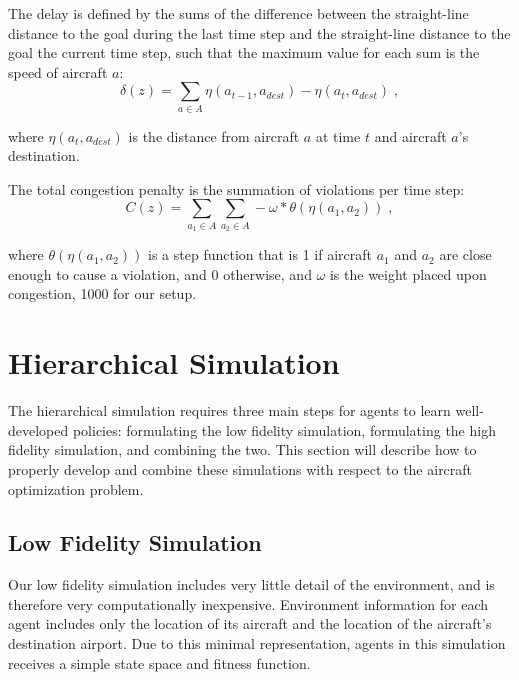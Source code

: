 \documentclass{sig-alternate}
\begin{document}
The delay is defined by the sums of the difference between the straight-line distance to the goal during the last time step and the straight-line distance to the goal the current time step, such that the maximum value for each sum is the speed of aircraft $a$:
%
\begin{equation} \label{eq:DistanceReward}
\delta(z) = \displaystyle\sum\limits_{a \in A} \eta(a_{t-1},a_{dest}) - \eta(a_{t},a_{dest})\;,
\end{equation}

where $\eta(a_{t},a_{dest})$ is the distance from aircraft $a$ at time $t$ and aircraft $a$'s destination.

The total congestion penalty is the summation of violations per time step:
%
\begin{equation} \label{eq:CongestionReward}
C(z) = \displaystyle\sum\limits_{a_1 \in A} \displaystyle\sum\limits_{a_2 \in A} -\omega * \theta(\eta(a_1,a_2))\;,
\end{equation}

where $\theta(\eta(a_1,a_2))$ is a step function that is 1 if aircraft $a_1$ and $a_2$ are close enough to cause a violation, and 0 otherwise, and $\omega$ is the weight placed upon congestion, 1000 for our setup.

\section{Hierarchical Simulation}

The hierarchical simulation requires three main steps for agents to learn well-developed policies: formulating the low fidelity simulation, formulating the high fidelity simulation, and combining the two. This section will describe how to properly develop and combine these simulations with respect to the aircraft optimization problem.

\subsection{Low Fidelity Simulation}

Our low fidelity simulation includes very little detail of the environment, and is therefore very computationally inexpensive. Environment information for each agent includes only the location of its aircraft and the location of the aircraft's destination airport. Due to this minimal representation, agents in this simulation receives a simple state space and fitness function.
\end{document}

